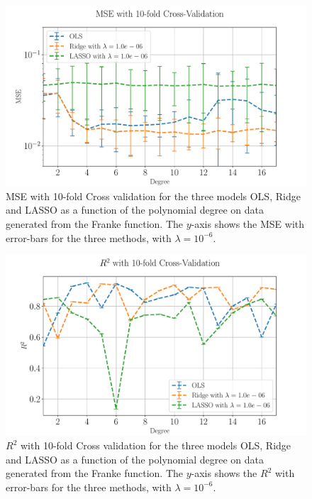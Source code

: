 \documentclass[%
reprint,
amsmath,amssymb,
aps,
pra,
]{revtex4-2}
\begin{document}
\begin{figure}[ht!]
	\centering
	\includegraphics[width=\linewidth]{Python/Figures/CV/CV_MSE_Unscaled_0.pdf}
	\caption{MSE with 10-fold Cross validation for the three models OLS, Ridge and LASSO as a function of the polynomial degree on data generated from the Franke function. The $y$-axis shows the MSE with error-bars for the three methods, with \(\lambda=10^{-6}\). }
	\label{fig:Franke_MSE_CV}
\end{figure}
\begin{figure}[ht!]
	\centering
	\includegraphics[width=\linewidth]{Python/Figures/CV/CV_R2_Unscaled_0.pdf}
	\caption{$R^2$ with 10-fold Cross validation for the three models OLS, Ridge and LASSO as a function of the polynomial degree on data generated from the Franke function. The $y$-axis shows the $R^2$ with error-bars for the three methods, with \(\lambda=10^{-6}\). }
	\label{fig:Franke_R2_CV}
\end{figure}
\end{document}
